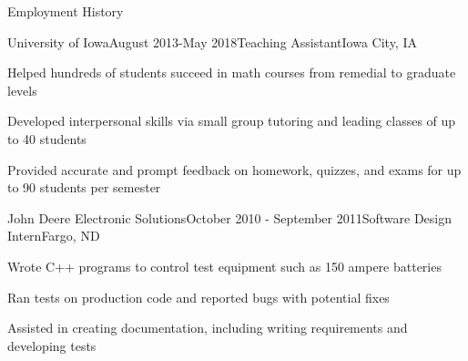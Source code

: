 \documentclass{resume} %
\begin{document}

\begin{rSection}{Employment History}

\begin{rSubsection}{University of Iowa}{August 2013-May 2018}{Teaching Assistant}{Iowa City, IA}
\item Helped hundreds of students succeed in math courses from remedial to graduate levels
\item Developed interpersonal skills via small group tutoring and leading classes of up to 40 students
\item Provided accurate and prompt feedback on homework, quizzes, and exams for up to 90 students per semester
\end{rSubsection}


\begin{rSubsection}{John Deere Electronic Solutions}{October 2010 - September 2011}{Software Design Intern}{Fargo, ND}
\item Wrote C++ programs to control test equipment such as 150 ampere batteries
\item Ran tests on production code and reported bugs with potential fixes
\item Assisted in creating documentation, including writing requirements and developing tests
\end{rSubsection}



\end{rSection}







\end{document}
